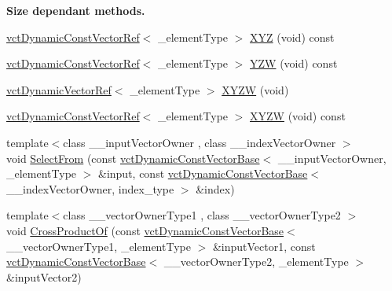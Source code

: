 \begin{Indent}{\bf Size dependant methods.}
\begin{DoxyCompactItemize}
\hyperlink{classvct_dynamic_const_vector_ref}{vct\+Dynamic\+Const\+Vector\+Ref}$<$ \+\_\+element\+Type $>$ \hyperlink{classvct_dynamic_vector_base_ae9729a3797a319b7354c0a7de7728acc}{X\+Y\+Z} (void) const 
\item 
\hyperlink{classvct_dynamic_const_vector_ref}{vct\+Dynamic\+Const\+Vector\+Ref}$<$ \+\_\+element\+Type $>$ \hyperlink{classvct_dynamic_vector_base_ad0fa6ceb43b20c493d8e5b8c58e5914d}{Y\+Z\+W} (void) const 
\item 
\hyperlink{classvct_dynamic_vector_ref}{vct\+Dynamic\+Vector\+Ref}$<$ \+\_\+element\+Type $>$ \hyperlink{classvct_dynamic_vector_base_a039fd2542bf02f1f02d7ba5db6b6c5cf}{X\+Y\+Z\+W} (void)
\item 
\hyperlink{classvct_dynamic_const_vector_ref}{vct\+Dynamic\+Const\+Vector\+Ref}$<$ \+\_\+element\+Type $>$ \hyperlink{classvct_dynamic_vector_base_a0c8bf0dd9ff05cc3d77f9c0b1c309138}{X\+Y\+Z\+W} (void) const 
\item 
{\footnotesize template$<$class \+\_\+\+\_\+input\+Vector\+Owner , class \+\_\+\+\_\+index\+Vector\+Owner $>$ }\\void \hyperlink{classvct_dynamic_vector_base_a5c4b71a4400bd77cfd0978f6ea5306d4}{Select\+From} (const \hyperlink{classvct_dynamic_const_vector_base}{vct\+Dynamic\+Const\+Vector\+Base}$<$ \+\_\+\+\_\+input\+Vector\+Owner, \+\_\+element\+Type $>$ \&input, const \hyperlink{classvct_dynamic_const_vector_base}{vct\+Dynamic\+Const\+Vector\+Base}$<$ \+\_\+\+\_\+index\+Vector\+Owner, index\+\_\+type $>$ \&index)
\item 
{\footnotesize template$<$class \+\_\+\+\_\+vector\+Owner\+Type1 , class \+\_\+\+\_\+vector\+Owner\+Type2 $>$ }\\void \hyperlink{classvct_dynamic_vector_base_a716dd14b3357992e5c4b8c395a93e0b3}{Cross\+Product\+Of} (const \hyperlink{classvct_dynamic_const_vector_base}{vct\+Dynamic\+Const\+Vector\+Base}$<$ \+\_\+\+\_\+vector\+Owner\+Type1, \+\_\+element\+Type $>$ \&input\+Vector1, const \hyperlink{classvct_dynamic_const_vector_base}{vct\+Dynamic\+Const\+Vector\+Base}$<$ \+\_\+\+\_\+vector\+Owner\+Type2, \+\_\+element\+Type $>$ \&input\+Vector2)
\end{DoxyCompactItemize}
\end{Indent}
